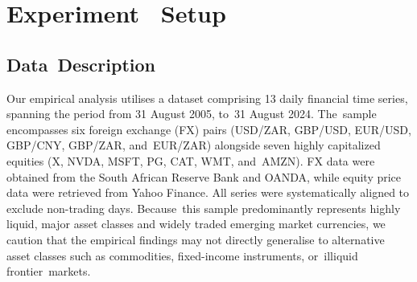 \documentclass[risks,article,accept,pdftex,moreauthors]{Definitions/mdpi}
\begin{document}
\section{{Experiment}%
~Setup}
\label{sec:experiments}
\unskip

\subsection{Data~Description}
Our empirical analysis utilises a dataset comprising 13 daily financial time series, spanning the period from {31 August 2005,} %
 to~{31 August 2024}. %
The~sample encompasses six foreign exchange (FX) pairs (USD/ZAR, GBP/USD, EUR/USD, GBP/CNY, GBP/ZAR, and~EUR/ZAR) alongside seven highly capitalized equities (X, NVDA, MSFT, PG, CAT, WMT, and~AMZN). FX data were obtained from the South African Reserve Bank and OANDA, while equity price data were retrieved from Yahoo Finance. All series were systematically aligned to exclude non-trading days. Because~this sample predominantly represents highly liquid, major asset classes and widely traded emerging market currencies, we caution that the empirical findings may not directly generalise to alternative asset classes such as commodities, fixed-income instruments, or~illiquid frontier~markets.
\end{document}
